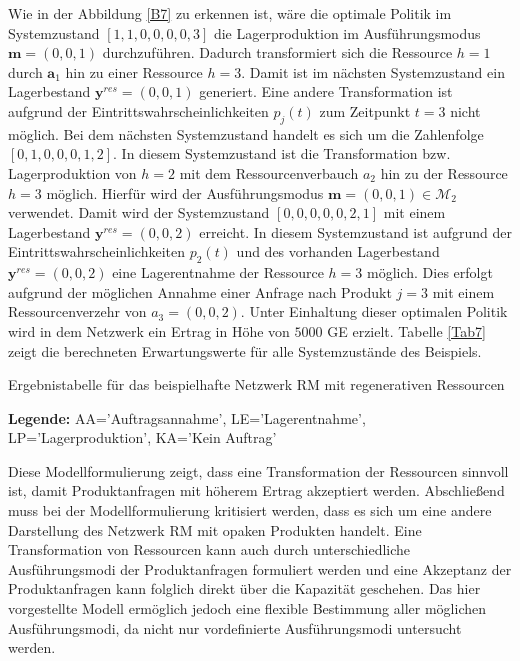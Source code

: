 Wie in der Abbildung \ref{B7} zu erkennen ist, wäre die optimale Politik im Systemzustand $[1,1,0,0,0,0,3]$ die Lagerproduktion im Ausführungsmodus $\textbf{m}=(0,0,1)$ durchzuführen. Dadurch transformiert sich die Ressource $h=1$ durch $\textbf{a}_{1}$ hin zu einer Ressource $h=3$. Damit ist im nächsten Systemzustand ein Lagerbestand $\textbf{y}^{res}=(0,0,1)$ generiert. Eine andere Transformation ist aufgrund der Eintrittswahrscheinlichkeiten $p_{j}(t)$ zum Zeitpunkt $t=3$ nicht möglich. Bei dem nächsten Systemzustand handelt es sich um die Zahlenfolge $[0,1,0,0,0,1,2]$. In diesem Systemzustand ist die Transformation bzw. Lagerproduktion von $h=2$ mit dem Ressourcenverbauch $a_{2}$ hin zu der Ressource $h=3$ möglich. Hierfür wird der Ausführungsmodus $\textbf{m}=(0,0,1)\in\mathcal{M}_2$ verwendet. Damit wird der Systemzustand $[0,0,0,0,0,2,1]$ mit einem Lagerbestand $\textbf{y}^{res}=(0,0,2)$ erreicht. In diesem Systemzustand ist aufgrund der Eintrittswahrscheinlichkeiten $p_2(t)$ und des vorhanden Lagerbestand $\textbf{y}^{res}=(0,0,2)$ eine Lagerentnahme der Ressource $h=3$ möglich. Dies erfolgt aufgrund der möglichen Annahme einer Anfrage nach Produkt $j=3$ mit einem Ressourcenverzehr von $a_{3}=(0,0,2)$. Unter Einhaltung dieser optimalen Politik wird in dem Netzwerk ein Ertrag in Höhe von $5000$ GE erzielt. Tabelle \ref{Tab7} zeigt die berechneten Erwartungswerte für alle Systemzustände des Beispiels. 

\begin{table}
\begin{footnotesize}
    \caption{Ergebnistabelle für das beispielhafte Netzwerk RM mit regenerativen Ressourcen} \label{Tab7}
    \vspace*{3mm}
    \begin{center}
      {\footnotesize \textbf{Legende:} AA='Auftragsannahme', LE='Lagerentnahme', LP='Lagerproduktion', KA='Kein Auftrag'} 
      \end{center}
\end{footnotesize}
\end{table}

Diese Modellformulierung zeigt, dass eine Transformation der Ressourcen sinnvoll ist, damit Produktanfragen mit höherem Ertrag akzeptiert werden. Abschließend muss bei der Modellformulierung kritisiert werden, dass es sich um eine andere Darstellung des Netzwerk RM mit opaken Produkten handelt. Eine Transformation von Ressourcen kann auch durch unterschiedliche Ausführungsmodi der Produktanfragen formuliert werden und eine Akzeptanz der Produktanfragen kann folglich direkt über die Kapazität geschehen. Das hier vorgestellte Modell ermöglich jedoch eine flexible Bestimmung aller möglichen Ausführungsmodi, da nicht nur vordefinierte Ausführungsmodi untersucht werden.

